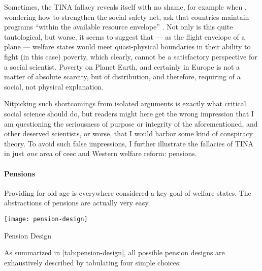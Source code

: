 Sometimes, the TINA fallacy reveals itself with no shame, for example when \citeauthor{Grow2005}, wondering how to strengthen the social safety net, ask that countries maintain programs ``within the available resource envelope'' \citeyearpar[39]{Grow2005}.
Not only is this quite tautological, but worse, it seems to suggest that --- as the flight envelope of a plane --- welfare states would meet quasi-physical boundaries in their ability to fight (in this case) poverty, which clearly, cannot be a satisfactory perspective for a social scientist.
Poverty on Planet Earth, and certainly in Europe is not a matter of absolute scarcity, but of distribution, and therefore, requiring of a social, not physical explanation.

Nitpicking such shortcomings from isolated arguments is exactly what critical social science should do, but readers might here get the wrong impression that I am questioning the seriousness of purpose or integrity of the aforementioned, and other deserved scientists, or worse, that I would harbor some kind of conspiracy theory.
To avoid such false impressions, I further illustrate the fallacies of TINA in just \emph{one} area of \gls{ceec} and Western welfare reform:
pensions.

\paragraph{Pensions}
	\label{sec:pensions}
Providing for old age is everywhere considered a key goal of welfare states.
The abstractions of pensions are actually very easy.

 \begin{table}[htbp]
	\centering
	\texttt{[image: pension-design]}
	\caption{Pension Design}
	\label{tab:pension-design}
\end{table}%

As summarized in \autoref{tab:pension-design}, all possible pension designs are exhaustively described by tabulating four simple choices:

